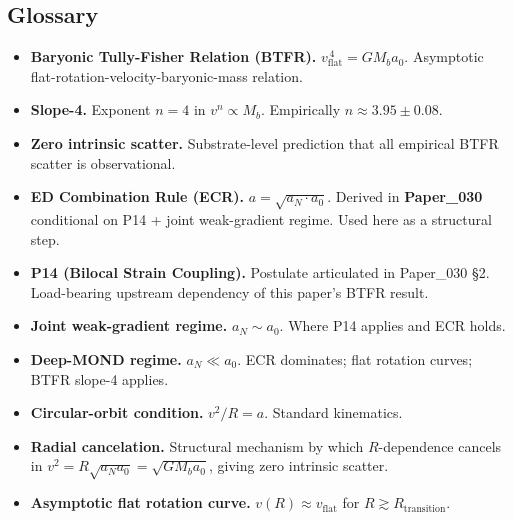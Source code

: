 \documentclass[11pt,a4paper]{article}
\begin{document}
\subsection*{Glossary}

\begin{itemize}[noitemsep]
\item \textbf{Baryonic Tully-Fisher Relation (BTFR).} $v_\mathrm{flat}^{\,4} = GM_b a_0$. Asymptotic flat-rotation-velocity-baryonic-mass relation.
\item \textbf{Slope-4.} Exponent $n = 4$ in $v^n \propto M_b$. Empirically $n \approx 3.95 \pm 0.08$.
\item \textbf{Zero intrinsic scatter.} Substrate-level prediction that all empirical BTFR scatter is observational.
\item \textbf{ED Combination Rule (ECR).} $a = \sqrt{a_N \cdot a_0}$. Derived in \textbf{Paper\_030} conditional on P14 + joint weak-gradient regime. Used here as a structural step.
\item \textbf{P14 (Bilocal Strain Coupling).} Postulate articulated in Paper\_030 \S2. Load-bearing upstream dependency of this paper's BTFR result.
\item \textbf{Joint weak-gradient regime.} $a_N \sim a_0$. Where P14 applies and ECR holds.
\item \textbf{Deep-MOND regime.} $a_N \ll a_0$. ECR dominates; flat rotation curves; BTFR slope-4 applies.
\item \textbf{Circular-orbit condition.} $v^2/R = a$. Standard kinematics.
\item \textbf{Radial cancelation.} Structural mechanism by which $R$-dependence cancels in $v^2 = R\sqrt{a_N a_0} = \sqrt{GM_b a_0}$, giving zero intrinsic scatter.
\item \textbf{Asymptotic flat rotation curve.} $v(R) \approx v_\mathrm{flat}$ for $R \gtrsim R_\mathrm{transition}$.
\end{itemize}
\end{document}
